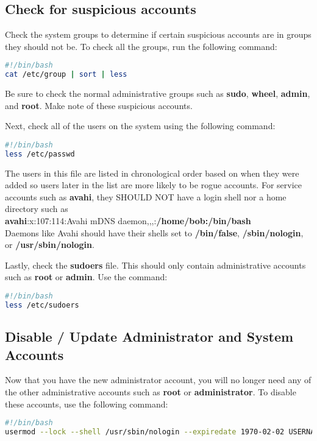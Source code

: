 \documentclass{article}
\begin{document}
\subsection{Check for suspicious accounts}
Check the system groups to determine if certain suspicious accounts are in
groups they should not be. To check all the groups, run the following command:
\begin{lstlisting}[language=bash]
#!/bin/bash
cat /etc/group | sort | less
\end{lstlisting}

Be sure to check the normal administrative groups such as \textbf{sudo},
\textbf{wheel}, \textbf{admin}, and \textbf{root}. Make note of these suspicious
accounts. 

Next, check all of the users on the system using the following command:
\begin{lstlisting}[language=bash]
#!/bin/bash
less /etc/passwd
\end{lstlisting}
The users in this file are listed in chronological order based on when they were
added so users later in the list are more likely to be rogue accounts. For
service accounts such as \textbf{avahi}, they SHOULD NOT have a login shell nor
a home directory such as \\
\textbf{avahi}:x:107:114:Avahi mDNS daemon,,,:\textbf{/home/bob:/bin/bash} \\
Daemons like Avahi should have their shells set to \textbf{/bin/false},
\textbf{/sbin/nologin}, or \textbf{/usr/sbin/nologin}. 

Lastly, check the \textbf{sudoers} file. This should only contain administrative
accounts such as \textbf{root} or \textbf{admin}. Use the command:
\begin{lstlisting}[language=bash]
#!/bin/bash
less /etc/sudoers
\end{lstlisting}

\subsection{Disable / Update Administrator and System Accounts}
Now that you have the new administrator account, you will no longer need any of
the other administrative accounts such as \textbf{root} or
\textbf{administrator}. To disable these accounts, use the following command:
\begin{lstlisting}[language=bash]
#!/bin/bash
usermod --lock --shell /usr/sbin/nologin --expiredate 1970-02-02 USERNAME
\end{lstlisting}
\end{document}
